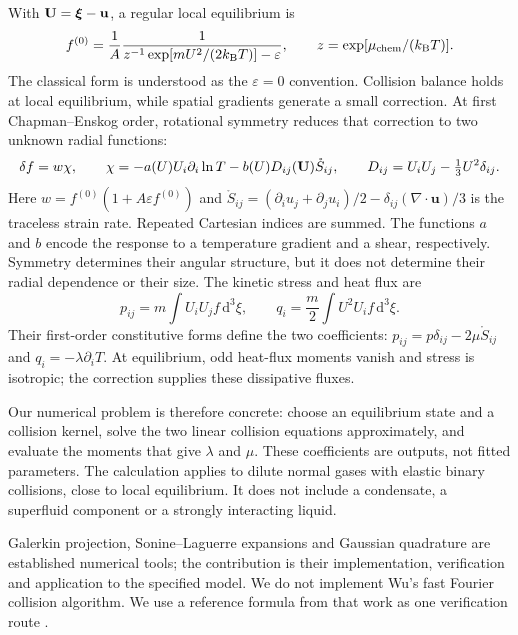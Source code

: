 With $\mathbf U=\boldsymbol\xi-\mathbf u$, a regular local equilibrium is
\begin{equation}
 f^{(0)}=\frac1A\frac1{z^{-1}\exp[mU^2/(2k_{\mathrm B}T)]-\varepsilon},
 \qquad z=\exp[\mu_{\rm chem}/(k_{\mathrm B}T)].
\end{equation}
The classical form is understood as the $\varepsilon=0$ convention.
Collision balance holds at local equilibrium, while spatial gradients
generate a small correction. At first Chapman--Enskog order, rotational
symmetry reduces that correction to two unknown radial functions:
\begin{equation}
 \delta f=w\chi,\qquad
 \chi=-a(U)U_i\partial_i\ln T
       -b(U)D_{ij}(\mathbf U)\mathring S_{ij},\qquad
 D_{ij}=U_iU_j-\tfrac13U^2\delta_{ij}.
 \label{qt:ansatz}
\end{equation}
Here $w=f^{(0)}(1+A\varepsilon f^{(0)})$ and
$\mathring S_{ij}=(\partial_i u_j+\partial_j u_i)/2
-\delta_{ij}(\nabla\cdot\mathbf u)/3$ is the traceless strain rate.
Repeated Cartesian indices are summed. The functions $a$ and $b$ encode the response to a temperature
gradient and a shear, respectively. Symmetry determines their angular
structure, but it does not determine their radial dependence or their size.
The kinetic stress and heat flux are
\begin{equation}
 p_{ij}=m\int U_iU_j f\,\mathrm d^3\xi,
 \qquad q_i=\frac m2\int U^2U_i f\,\mathrm d^3\xi.
\end{equation}
Their first-order constitutive forms define the two coefficients:
$p_{ij}=p\delta_{ij}-2\mu\mathring S_{ij}$ and
$q_i=-\lambda\partial_iT$. At equilibrium, odd heat-flux moments vanish
and stress is isotropic; the correction supplies these dissipative fluxes.

Our numerical problem is therefore concrete: choose an equilibrium state and
a collision kernel, solve the two linear collision equations approximately,
and evaluate the moments that give $\lambda$ and $\mu$. These coefficients
are outputs, not fitted parameters. The calculation applies to dilute normal
gases with elastic binary collisions, close to local equilibrium. It does not
include a condensate, a superfluid component or a strongly interacting liquid.

Galerkin projection, Sonine--Laguerre expansions and Gaussian quadrature are
established numerical tools; the contribution is their implementation,
verification and application to the specified model. We do not implement
Wu's fast Fourier collision algorithm. We use a reference formula from that
work as one verification route \cite{qtWu}.

